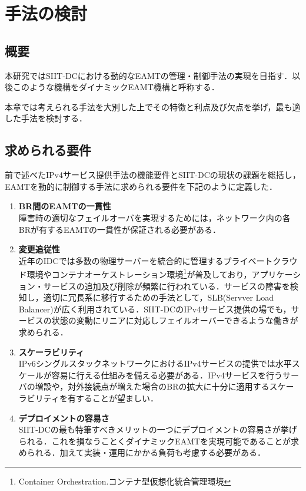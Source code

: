 \chapter{手法の検討}
\label{consideration}

\section{概要}
本研究ではSIIT-DCにおける動的なEAMTの管理・制御手法の実現を目指す．以後このような機構をダイナミックEAMT機構と呼称する．

本章では考えられる手法を大別した上でその特徴と利点及び欠点を挙げ，最も適した手法を検討する．


\section{求められる要件}
\label{consideration:points}
前で述べたIPv4サービス提供手法の機能要件とSIIT-DCの現状の課題を総括し，EAMTを動的に制御する手法に求められる要件を下記のように定義した．

\begin{enumerate}
    \item \textbf{BR間のEAMTの一貫性} \\
    障害時の適切なフェイルオーバを実現するためには，ネットワーク内の各BRが有するEAMTの一貫性が保証される必要がある．
    \item \textbf{変更追従性} \\
    近年のIDCでは多数の物理サーバーを統合的に管理するプライベートクラウド環境やコンテナオーケストレーション環境\footnote{Container Orchestration.コンテナ型仮想化統合管理環境}が普及しており，アプリケーション・サービスの追加及び削除が頻繁に行われている．サービスの障害を検知し，適切に冗長系に移行するための手法として，SLB(Servver Load Balancer)が広く利用されている．SIIT-DCのIPv4サービス提供の場でも，サービスの状態の変動にリニアに対応しフェイルオーバーできるような働きが求められる．
    \item \textbf{スケーラビリティ}　\\ 
    IPv6シングルスタックネットワークにおけるIPv4サービスの提供では水平スケールが容易に行える仕組みを備える必要がある．IPv4サービスを行うサーバの増設や，対外接続点が増えた場合のBRの拡大に十分に適用するスケーラビリティを有することが望ましい．
    \item \textbf{デプロイメントの容易さ} \\ 
    SIIT-DCの最も特筆すべきメリットの一つにデプロイメントの容易さが挙げられる．これを損なうことくダイナミックEAMTを実現可能であることが求められる．加えて実装・運用にかかる負荷も考慮する必要がある．
\end{enumerate}


